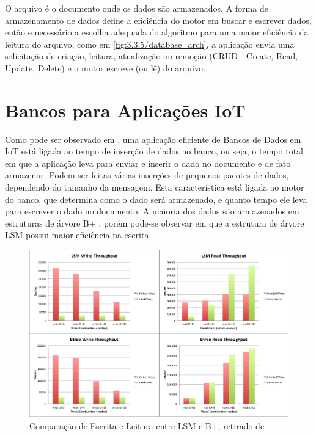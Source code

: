 O arquivo é o documento onde os dados são armazenados. A forma de armazenamento de dados define a eficiência do motor em buscar e escrever dados, então e necessário a escolha adequada do algoritmo para uma maior eficiência da leitura do arquivo, como em \ref{fig:3.3.5/database_arch}, a aplicação envia uma solicitação de criação, leitura, atualização ou remoção (CRUD - Create, Read, Update, Delete) e o motor escreve (ou lê) do arquivo.


 
\section{Bancos para Aplicações IoT}
\label{section:bancos_IoT}


Como pode ser observado em \cite{Damodaran}, uma aplicação eficiente de Bancos de Dados em IoT está ligada ao tempo de inserção de dados no banco, ou seja,  o tempo total em que a aplicação leva para enviar e inserir o dado no documento e de fato armazenar. Podem ser feitas várias inserções de pequenos pacotes de dados, dependendo do tamanho da mensagem. Esta característica está ligada ao motor do banco, que determina como o dado será armazenado, e quanto tempo ele leva para escrever o dado no documento. A maioria dos dados são armazenados em estruturas de árvore B+ \cite{b-tree}, porém pode-se observar em \cite{Damodaran} que a estrutura de árvore LSM  \cite{O'Neal-Gawlick-Cheng} possui maior eficiência na escrita.


\begin{figure}[h!]
\centering
\includegraphics[width=14cm]{./02_Capitulos/02_Cap3/figures/LSM_btree}
\caption{Comparação de Escrita e Leitura entre LSM e B+, retirado de \cite{btrees-vs-lsmtrees}}
\label{fig:3.3.5/b-lsm}
\end{figure}

